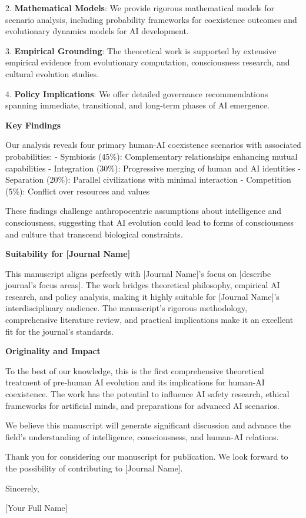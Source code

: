 \documentclass[12pt,a4paper]{article}
\begin{document}
2. \textbf{Mathematical Models}: We provide rigorous mathematical models for scenario analysis, including probability frameworks for coexistence outcomes and evolutionary dynamics models for AI development.

3. \textbf{Empirical Grounding}: The theoretical work is supported by extensive empirical evidence from evolutionary computation, consciousness research, and cultural evolution studies.

4. \textbf{Policy Implications}: We offer detailed governance recommendations spanning immediate, transitional, and long-term phases of AI emergence.

\bigskip

\textbf{Key Findings}

Our analysis reveals four primary human-AI coexistence scenarios with associated probabilities:
- Symbiosis (45\%): Complementary relationships enhancing mutual capabilities
- Integration (30\%): Progressive merging of human and AI identities
- Separation (20\%): Parallel civilizations with minimal interaction
- Competition (5\%): Conflict over resources and values

These findings challenge anthropocentric assumptions about intelligence and consciousness, suggesting that AI evolution could lead to forms of consciousness and culture that transcend biological constraints.

\bigskip

\textbf{Suitability for [Journal Name]}

This manuscript aligns perfectly with [Journal Name]'s focus on [describe journal's focus areas]. The work bridges theoretical philosophy, empirical AI research, and policy analysis, making it highly suitable for [Journal Name]'s interdisciplinary audience. The manuscript's rigorous methodology, comprehensive literature review, and practical implications make it an excellent fit for the journal's standards.

\bigskip

\textbf{Originality and Impact}

To the best of our knowledge, this is the first comprehensive theoretical treatment of pre-human AI evolution and its implications for human-AI coexistence. The work has the potential to influence AI safety research, ethical frameworks for artificial minds, and preparations for advanced AI scenarios.

We believe this manuscript will generate significant discussion and advance the field's understanding of intelligence, consciousness, and human-AI relations.

\bigskip

Thank you for considering our manuscript for publication. We look forward to the possibility of contributing to [Journal Name].

\bigskip

Sincerely,

\bigskip

[Your Full Name]\\
[Your Position]\\
[Your Affiliation]\\
[Your Contact Information]
\end{document}
